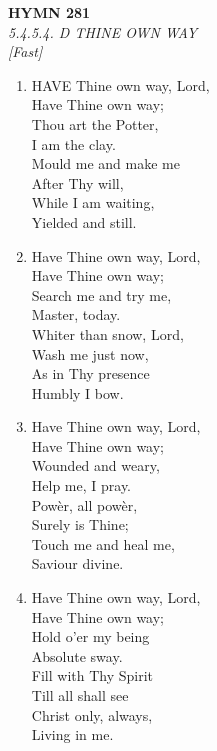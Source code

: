 \newpage
\begin{center}
    {\Large \textbf{HYMN 281}}
    \\
    \textit{5.4.5.4. D THINE OWN WAY}
    \\
    \textit{\small [Fast]}
\end{center}
\vspace{1em}

\begin{enumerate}
    \item HAVE Thine own way, Lord, \\
        Have Thine own way; \\
        Thou art the Potter, \\
        I am the clay. \\
        Mould me and make me \\
        After Thy will, \\
        While I am waiting, \\
        Yielded and still.

    \item Have Thine own way, Lord, \\
        Have Thine own way; \\
        Search me and try me, \\
        Master, today. \\
        Whiter than snow, Lord, \\
        Wash me just now, \\
        As in Thy presence \\
        Humbly I bow.

    \item Have Thine own way, Lord, \\
        Have Thine own way; \\
        Wounded and weary, \\
        Help me, I pray. \\
        Pow\`er, all pow\`er, \\
        Surely is Thine; \\
        Touch me and heal me, \\
        Saviour divine.

    \item Have Thine own way, Lord, \\
        Have Thine own way; \\
        Hold o'er my being \\
        Absolute sway. \\
        Fill with Thy Spirit \\
        Till all shall see \\
        Christ only, always, \\
        Living in me.

\end{enumerate}

